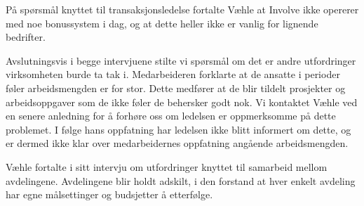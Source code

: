\indent \newline
På spørsmål knyttet til transaksjonsledelse fortalte Væhle at Involve ikke opererer med noe bonussystem i dag, og at dette heller ikke er vanlig for lignende bedrifter. 

\indent \newline
Avslutningsvis i begge intervjuene stilte vi spørsmål om det er andre utfordringer virksomheten burde ta tak i. Medarbeideren forklarte at de ansatte i perioder føler arbeidsmengden er for stor. Dette medfører at de blir tildelt prosjekter og arbeidsoppgaver som de ikke føler de behersker godt nok. Vi kontaktet Væhle ved en senere anledning for å forhøre oss om ledelsen er oppmerksomme på dette problemet. I følge hans oppfatning har ledelsen ikke blitt informert om dette, og er dermed ikke klar over medarbeidernes oppfatning angående arbeidsmengden. 

\indent \newline
Væhle fortalte i sitt intervju om utfordringer knyttet til samarbeid mellom avdelingene. Avdelingene blir holdt adskilt, i den forstand at hver enkelt avdeling har egne målsettinger og budsjetter å etterfølge. 
